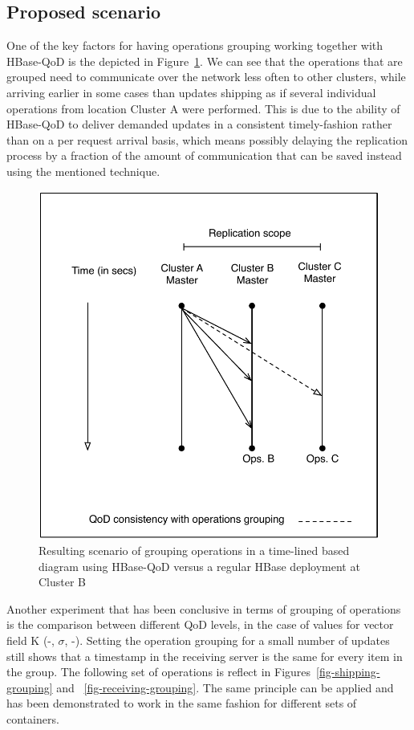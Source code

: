 \subsection{Proposed scenario}
One of the key factors for having operations grouping working together with HBase-QoD is the depicted in Figure~\ref{fig-qod-grouping}. We can see that the operations that are grouped need to communicate over the network less often to other clusters, while arriving earlier in some cases than updates shipping as if several individual operations from location Cluster A were performed. This is due to the ability of HBase-QoD to deliver demanded updates in a consistent timely-fashion rather than on a per request arrival basis, which means possibly delaying the replication process by a fraction of the amount of communication that can be saved instead using the mentioned technique.

\begin{figure}[t]
\centering
\includegraphics[scale=0.6]{figs/operation-grouping.pdf}
\caption{Resulting scenario of grouping operations in a time-lined based diagram using HBase-QoD versus a regular HBase deployment at Cluster B}
\label{fig-qod-grouping}
\end{figure}

Another experiment that has been conclusive in terms of grouping of operations is the comparison between different QoD levels, in the case of values for vector field K (-, $\sigma$, -). Setting the operation grouping for a small number of updates still shows that a timestamp in the receiving server is the same for every item in the group. The following set of operations is reflect in Figures~\ref{fig-shipping-grouping} and ~\ref{fig-receiving-grouping}. The same principle can be applied and has been demonstrated to work in the same fashion for different sets of containers.

